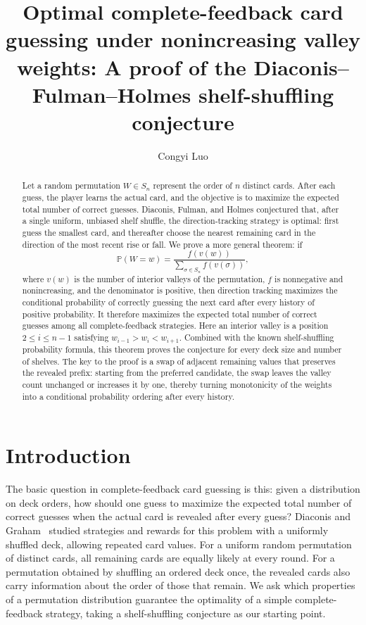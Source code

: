 \documentclass[11pt,reqno]{amsart}
\title[Optimal card guessing under nonincreasing valley weights]{Optimal complete-feedback card guessing under nonincreasing valley weights: A proof of the Diaconis--Fulman--Holmes shelf-shuffling conjecture}
\author{Congyi Luo}
\date{}
\numberwithin{equation}{section}
\theoremstyle{definition}
\theoremstyle{remark}
\begin{document}
\begin{abstract}
Let a random permutation $W\in S_n$ represent the order of $n$ distinct cards. After each guess, the player learns the actual card, and the objective is to maximize the expected total number of correct guesses. Diaconis, Fulman, and Holmes conjectured that, after a single uniform, unbiased shelf shuffle, the direction-tracking strategy is optimal: first guess the smallest card, and thereafter choose the nearest remaining card in the direction of the most recent rise or fall. We prove a more general theorem: if
\[
\mathbb P(W=w)=\frac{f(v(w))}{\sum_{\sigma\in S_n}f(v(\sigma))},
\]
where $v(w)$ is the number of interior valleys of the permutation, $f$ is nonnegative and nonincreasing, and the denominator is positive, then direction tracking maximizes the conditional probability of correctly guessing the next card after every history of positive probability. It therefore maximizes the expected total number of correct guesses among all complete-feedback strategies. Here an interior valley is a position $2\le i\le n-1$ satisfying $w_{i-1}>w_i<w_{i+1}$. Combined with the known shelf-shuffling probability formula, this theorem proves the conjecture for every deck size and number of shelves. The key to the proof is a swap of adjacent remaining values that preserves the revealed prefix: starting from the preferred candidate, the swap leaves the valley count unchanged or increases it by one, thereby turning monotonicity of the weights into a conditional probability ordering after every history.
\end{abstract}
\maketitle
\section{Introduction}
The basic question in complete-feedback card guessing is this: given a distribution on deck orders, how should one guess to maximize the expected total number of correct guesses when the actual card is revealed after every guess? Diaconis and Graham~\cite[Section 2]{DG} studied strategies and rewards for this problem with a uniformly shuffled deck, allowing repeated card values. For a uniform random permutation of distinct cards, all remaining cards are equally likely at every round. For a permutation obtained by shuffling an ordered deck once, the revealed cards also carry information about the order of those that remain. We ask which properties of a permutation distribution guarantee the optimality of a simple complete-feedback strategy, taking a shelf-shuffling conjecture as our starting point.
\end{document}
